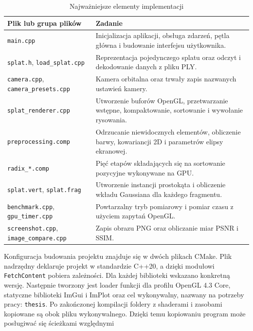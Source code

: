 \begin{table}[htbp]
  \centering
  \caption{Najważniejsze elementy implementacji}
  \label{tab:impl_pliki}
  \small
  \renewcommand{\arraystretch}{1.15}
  \begin{tabularx}{\textwidth}{
      >{\raggedright\arraybackslash}p{}
      >{\raggedright\arraybackslash}X}
    \toprule
    \textbf{Plik lub grupa plików} & \textbf{Zadanie} \\
    \midrule
    \texttt{main.cpp} & Inicjalizacja aplikacji, obsługa zdarzeń, pętla
      główna i budowanie interfejsu użytkownika. \\
    \texttt{splat.h}, \texttt{load\_splat.cpp} & Reprezentacja pojedynczego
      splatu oraz odczyt i dekodowanie danych z pliku PLY. \\
    \texttt{camera.cpp}, \texttt{camera\_presets.cpp} & Kamera orbitalna
      oraz trwały zapis nazwanych ustawień kamery. \\
    \texttt{splat\_renderer.cpp} & Utworzenie buforów OpenGL, przetwarzanie
      wstępne, kompaktowanie, sortowanie i wywołanie rysowania. \\
    \texttt{preprocessing.comp} & Odrzucanie niewidocznych elementów,
      obliczenie barwy, kowariancji 2D i parametrów elipsy ekranowej. \\
    \texttt{radix\_*.comp} & Pięć etapów składających się na sortowanie
      pozycyjne wykonywane na GPU. \\
    \texttt{splat.vert}, \texttt{splat.frag} & Utworzenie instancji
      prostokąta i obliczenie wkładu Gaussiana dla każdego fragmentu. \\
    \texttt{benchmark.cpp}, \texttt{gpu\_timer.cpp} & Powtarzalny tryb
      pomiarowy i pomiar czasu z użyciem zapytań OpenGL. \\
    \texttt{screenshot.cpp}, \texttt{image\_compare.cpp} & Zapis obrazu PNG
      oraz obliczanie miar PSNR i SSIM. \\
    \bottomrule
  \end{tabularx}
\end{table}
Konfiguracja budowania projektu znajduje się w dwóch plikach CMake. Plik nadrzędny deklaruje projekt w standardzie C++20, a dzięki modułowi \texttt{FetchContent} pobiera zależności. Dla każdej biblioteki wskazano konkretną wersję. Następnie tworzony jest loader funkcji dla profilu OpenGL 4.3 Core, statyczne biblioteki ImGui i ImPlot oraz cel wykonywalny, nazwany na potrzeby pracy: \texttt{thesis}. Po zakończonej kompilacji foldery z shaderami i zasobami kopiowane są obok pliku wykonywalnego. Dzięki temu kopiowaniu program może posługiwać się ścieżkami względnymi

